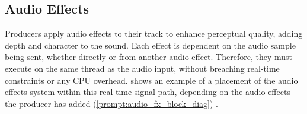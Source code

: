 \subsection{Audio Effects}

Producers apply audio effects to their track to enhance perceptual quality, 
adding depth and character to the sound. Each effect is dependent on the audio sample
being sent, whether directly or from another audio effect. Therefore, they must execute
on the same thread as the audio input, without breaching real-time constraints or any CPU overhead. 
 shows an example of a placement of the audio effects system within this real-time signal path, 
depending on the audio effects the producer has added (\cref{prompt:audio_fx_block_diag}) \cite{anthropicclaude}.




\pagebreak

\pagebreak
